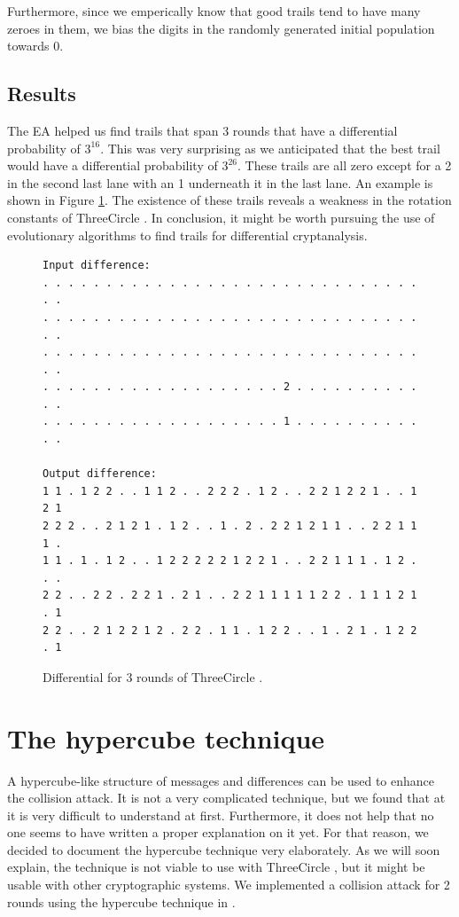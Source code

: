 \documentclass{report}
\newcommand{\ThreeCircle}{{\sc ThreeCircle} }
\begin{document}
Furthermore, since we emperically know that good trails tend to have many zeroes in them, we bias the digits in the randomly generated initial population towards 0.

\subsection{Results}
The EA helped us find trails that span 3 rounds that have a differential probability of $3^{16}$. This was very surprising as we anticipated that the best trail would have a differential probability of $3^{26}$. These trails are all zero except for a 2 in the second last lane with an 1 underneath it in the last lane. An example is shown in Figure \ref{fig:3r}. The existence of these trails reveals a weakness in the rotation constants of \ThreeCircle. In conclusion, it might be worth pursuing the use of evolutionary algorithms to find trails for differential cryptanalysis.
\begin{figure}
\begin{verbatim}
Input difference:
. . . . . . . . . . . . . . . . . . . . . . . . . . . . . . . .
. . . . . . . . . . . . . . . . . . . . . . . . . . . . . . . .
. . . . . . . . . . . . . . . . . . . . . . . . . . . . . . . .
. . . . . . . . . . . . . . . . . . . 2 . . . . . . . . . . . .
. . . . . . . . . . . . . . . . . . . 1 . . . . . . . . . . . .

Output difference:
1 1 . 1 2 2 . . 1 1 2 . . 2 2 2 . 1 2 . . 2 2 1 2 2 1 . . 1 2 1
2 2 2 . . 2 1 2 1 . 1 2 . . 1 . 2 . 2 2 1 2 1 1 . . 2 2 1 1 1 .
1 1 . 1 . 1 2 . . 1 2 2 2 2 2 1 2 2 1 . . 2 2 1 1 1 . 1 2 . . .
2 2 . . 2 2 . 2 2 1 . 2 1 . . 2 2 1 1 1 1 1 2 2 . 1 1 1 2 1 . 1
2 2 . . 2 1 2 2 1 2 . 2 2 . 1 1 . 1 2 2 . . 1 . 2 1 . 1 2 2 . 1
\end{verbatim}
\caption{Differential for 3 rounds of \ThreeCircle.}
\label{fig:3r}
\end{figure}

\section{The hypercube technique}
A hypercube-like structure of messages and differences can be used to enhance the collision attack.
It is not a very complicated technique, but we found that at it is very difficult to understand at first. Furthermore, it does not help that no one seems to have written a proper explanation on it yet. For that reason, we decided to document the hypercube technique very elaborately. As we will soon explain, the technique is not viable to use with \ThreeCircle, but it might be usable with other cryptographic systems. We implemented a collision attack for 2 rounds using the hypercube technique in .
\end{document}
